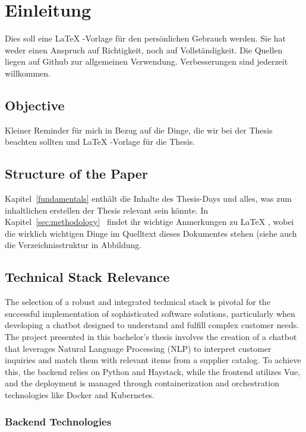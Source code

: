 \section{Einleitung}
Dies soll eine \LaTeX{}
-Vorlage für den persönlichen Gebrauch werden.
Sie hat weder einen Anspruch auf Richtigkeit, noch auf Vollständigkeit.
Die Quellen liegen auf Github zur allgemeinen Verwendung.
Verbesserungen sind jederzeit willkommen.

\subsection{Objective}
Kleiner Reminder für mich in Bezug auf die Dinge, die wir bei der Thesis beachten sollten und \LaTeX{}
-Vorlage für die Thesis.

\subsection{Structure of the Paper}
Kapitel~\ref{fundamentals}
enthält die Inhalte des Thesis-Days und alles, was zum inhaltlichen erstellen der Thesis relevant sein könnte.
In
Kapitel~\ref{sec:methodology}~ findet ihr wichtige Anmerkungen zu \LaTeX{}
, wobei die wirklich wichtigen Dinge im Quelltext dieses Dokumentes stehen (siehe auch die Verzeichnisstruktur in
Abbildung.

\subsection{Technical Stack Relevance}

The selection of a robust and integrated technical stack is pivotal for the successful implementation of sophisticated
software solutions, particularly when developing a chatbot designed to understand and fulfill complex customer needs.
The project presented in this bachelor’s thesis involves the creation of a chatbot that leverages Natural Language
Processing (NLP) to interpret customer inquiries and match them with relevant items from a supplier catalog.
To achieve
this, the backend relies on Python and Haystack, while the frontend utilizes Vue, and the deployment is
managed through containerization and orchestration technologies like Docker and Kubernetes.

\subsubsection{Backend Technologies}

